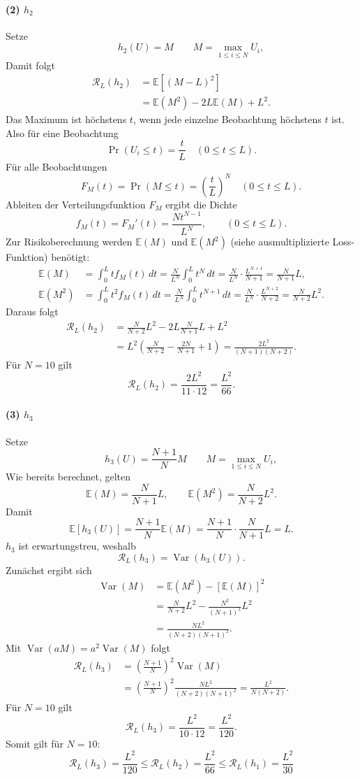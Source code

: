 \documentclass[11pt,a4paper]{article}
\newcommand{\E}{\mathbb{E}}
\newcommand{\Var}{\operatorname{Var}}
\newcommand{\Risk}{\mathcal{R}}
\begin{document}
\paragraph{(2) $h_2$}
Setze
\[
 \qquad h_2(U)=M
 \qquad M=\max_{1\le i\le N}U_i,
\]
Damit folgt
\begin{align*}
 \Risk_L(h_2)
 &=\E[(M-L)^2]\\
 &=\E(M^2)-2L\E(M)+L^2.
\end{align*}
Das Maximum ist höchstens $t$, wenn jede einzelne Beobachtung höchstens $t$ ist. Also für eine Beobachtung
\[
 \Pr(U_i\le t)=\frac tL
 \quad (0\le t\le L).
\]
Für alle Beobachtungen
\[
 \qquad
 F_M(t)=\Pr(M\le t)=\left(\frac tL\right)^N
 \quad (0\le t\le L).
\]
Ableiten der Verteilungsfunktion $F_M$ ergibt die Dichte
\[
 f_M(t)=F_M'(t)=\frac{Nt^{N-1}}{L^N},
 \qquad (0\le t\le L).
\]
Zur Risikoberechnung werden $\E(M)$ und $\E(M^2)$ (siehe ausmultiplizierte Loss-Funktion) benötigt:
\begin{align*}
 \E(M)
 &=\int_0^L t f_M(t)\,dt
 =\frac{N}{L^N}\int_0^L t^N\,dt
 =\frac{N}{L^N}\cdot\frac{L^{N+1}}{N+1}
 =\frac{N}{N+1}L,\\[3pt]
 \E(M^2)
 &=\int_0^L t^2 f_M(t)\,dt
 =\frac{N}{L^N}\int_0^L t^{N+1}\,dt
 =\frac{N}{L^N}\cdot\frac{L^{N+2}}{N+2}
 =\frac{N}{N+2}L^2.
\end{align*}
Daraus folgt
\begin{align*}
 \Risk_L(h_2)
 &=\frac{N}{N+2}L^2-2L\frac{N}{N+1}L+L^2\\
 &=L^2\left(\frac{N}{N+2}-\frac{2N}{N+1}+1\right)
 =\boxed{\frac{2L^2}{(N+1)(N+2)}}.
\end{align*}
Für $N=10$ gilt
\[
 \boxed{\Risk_L(h_2)=\frac{2L^2}{11\cdot12}=\frac{L^2}{66}}.
\]

\paragraph{(3) $h_3$}
Setze
\[
 \qquad h_3(U)=\frac{N+1}{N}M
 \qquad M=\max_{1\le i\le N}U_i,
\]
Wie bereits berechnet, gelten
\[
 \E(M)=\frac{N}{N+1}L,
 \qquad \E(M^2)=\frac{N}{N+2}L^2.
\]
Damit
\[
 \E[h_3(U)]
 =\frac{N+1}{N}\E(M)
 =\frac{N+1}{N}\cdot\frac{N}{N+1}L=L.
\]
$h_3$ ist erwartungstreu, weshalb
\[
 \Risk_L(h_3)=\Var(h_3(U)).
\]
Zunächst ergibt sich
\begin{align*}
 \Var(M)
 &=\E(M^2)-[\E(M)]^2\\
 &=\frac{N}{N+2}L^2-\frac{N^2}{(N+1)^2}L^2\\
 &=\frac{NL^2}{(N+2)(N+1)^2}.
\end{align*}
Mit $\Var(aM)=a^2\Var(M)$ folgt
\begin{align*}
 \Risk_L(h_3)
 &=\left(\frac{N+1}{N}\right)^2\Var(M)\\
 &=\left(\frac{N+1}{N}\right)^2
 \frac{NL^2}{(N+2)(N+1)^2}
 =\boxed{\frac{L^2}{N(N+2)}}.
\end{align*}
Für $N=10$ gilt
\[
 \boxed{\Risk_L(h_3)=\frac{L^2}{10\cdot12}=\frac{L^2}{120}}.
\]
Somit gilt für $N=10$:
\[
 \boxed{
 \Risk_L(h_3)=\frac{L^2}{120}
 \le\Risk_L(h_2)=\frac{L^2}{66}
 \le\Risk_L(h_1)=\frac{L^2}{30}}
\]
\end{document}
